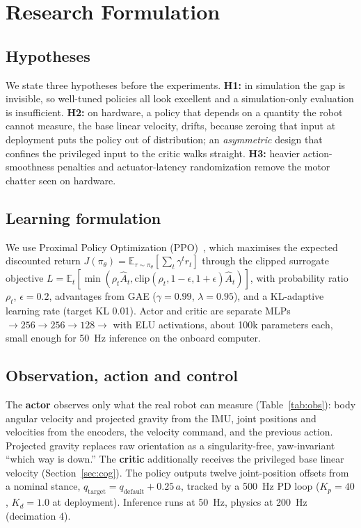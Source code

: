 \documentclass[conference]{IEEEtran}
\begin{document}
\section{Research Formulation}
\label{sec:method}

\subsection{Hypotheses}
We state three hypotheses before the experiments. \textbf{H1:} in simulation the gap is invisible,
so well-tuned policies all look excellent and a simulation-only evaluation is insufficient.
\textbf{H2:} on hardware, a policy that depends on a quantity the robot cannot measure, the base
linear velocity, drifts, because zeroing that input at deployment puts the policy out of
distribution; an \emph{asymmetric} design that confines the privileged input to the critic walks
straight. \textbf{H3:} heavier action-smoothness penalties and actuator-latency randomization
remove the motor chatter seen on hardware.

\subsection{Learning formulation}
We use Proximal Policy Optimization (PPO)~\cite{schulman2017}, which maximises the expected
discounted return $J(\pi_\theta)=\mathbb{E}_{\tau\sim\pi_\theta}[\sum_t\gamma^t r_t]$ through the
clipped surrogate objective
$L=\mathbb{E}_t[\min(\rho_t\hat{A}_t,\mathrm{clip}(\rho_t,1{-}\epsilon,1{+}\epsilon)\hat{A}_t)]$,
with probability ratio $\rho_t$, $\epsilon=0.2$, advantages from GAE ($\gamma=0.99$,
$\lambda=0.95$), and a KL-adaptive learning rate (target KL 0.01). Actor and critic are separate
MLPs $\to256\to256\to128\to$ with ELU activations, about 100k parameters each, small enough for
50~Hz inference on the onboard computer.

\subsection{Observation, action and control}
The \textbf{actor} observes only what the real robot can measure (Table~\ref{tab:obs}): body
angular velocity and projected gravity from the IMU, joint positions and velocities from the
encoders, the velocity command, and the previous action. Projected gravity replaces raw
orientation as a singularity-free, yaw-invariant ``which way is down.'' The \textbf{critic}
additionally receives the privileged base linear velocity (Section~\ref{sec:cog}). The policy
outputs twelve joint-position offsets from a nominal stance,
$q_{\mathrm{target}}=q_{\mathrm{default}}+0.25\,a$, tracked by a 500~Hz PD loop ($K_p{=}40$,
$K_d{=}1.0$ at deployment). Inference runs at 50~Hz, physics at 200~Hz (decimation 4).
\end{document}
